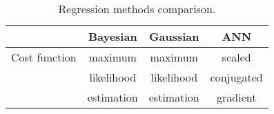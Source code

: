 \begin{table}[htbp]
  \centering

    \begin{tabular}{l|ccc}
    \hline
          & Bayesian & Gaussian & ANN \\
          \hline
    Cost function & maximum  & maximum & scaled \\
     			  & likelihood & likelihood & conjugated \\
     			  & estimation & estimation & gradient \\
    \hline
    \end{tabular}%
      \caption{Regression methods comparison.}
  \label{tab:17regressionmethods}%
\end{table}%